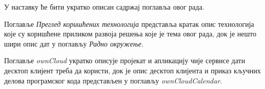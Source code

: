У наставку ће бити укратко описан садржај поглавља овог рада.

Поглавље \textit{Преглед коришћених технологија} представља кратак опис технологија које су коришћене приликом развоја решења које је тема овог рада, док је нешто шири опис дат у поглављу \textit{Радно окружење}.

Поглавље \textit{ownCloud} укратко описује пројекат и апликацију чије сервисе дати десктоп клијент треба да користи, док је опис десктоп клијента и приказ кључних делова програмског кода представљен у поглављу \textit{ownCloudCalendar}. 